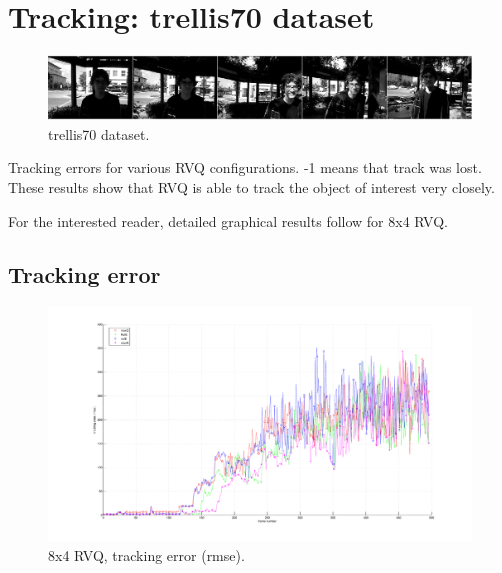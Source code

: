 \clearpage
\newpage
\section{Tracking: trellis70 dataset} 
								\begin{figure}[h]
								\centering
								\includegraphics[width=1.0\textwidth]{thesis/seq_4_trellis70.png}
								\caption{trellis70 dataset.}
								\label{fig:seq_4_trellis70}
								\end{figure}



\begin{table}[h]
\centering

\caption{Tracking errors for various RVQ configurations.  -1 means that track was lost.  These results show that RVQ is able to track the object of interest very closely.}
\end{table}

For the interested reader, detailed graphical results follow for 8x4 RVQ.
\clearpage
\newpage
\subsection{Tracking error}

								\begin{figure}[h!]
								\centering
								\includegraphics[height=0.38\textheight]{thesis/4_trellis70_8_4_1000_trk_rmse.pdf}
								\caption{8x4 RVQ, tracking error (rmse).}
								\label{fig:4_trellis70_8_4_1000_trk_rmse}
								\end{figure}


